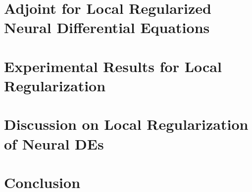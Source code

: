 \section{Adjoint for Local Regularized Neural Differential Equations}
\label{sec:adjoint_for_local_regularized_neural_differential_equations}

\section{Experimental Results for Local Regularization}
\label{sec:experimental_results_local_regularized_neural_des}

\section{Discussion on Local Regularization of Neural DEs}
\label{sec:discussion_on_local_regularization_of_neural_des}

\section{Conclusion}
\label{sec:conclusion}
